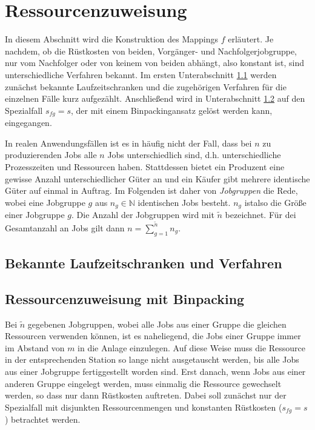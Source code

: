 \documentclass{scrreprt}
\begin{document}
\section{Ressourcenzuweisung}
\label{sec:Ressourcenzuweisung}
In diesem Abschnitt wird die Konstruktion des Mappings $f$ erläutert.
Je nachdem, ob die Rüstkosten von beiden, Vorgänger- und Nachfolgerjobgruppe, nur vom Nachfolger oder von keinem von beiden abhängt, also konstant ist,
sind unterschiedliche Verfahren bekannt.
Im ersten Unterabschnitt \ref{subsec:BekannteLaufzeitschrankenUndVerfahren} werden zunächst bekannte Laufzeitschranken und die zugehörigen Verfahren 
für die einzelnen Fälle kurz aufgezählt.
Anschließend wird in Unterabschnitt \ref{subsec:RessourcenzuweisungMitBinpacking} auf den Spezialfall $s_{fg}=s$, der mit einem Binpackingansatz gelöst werden kann,
eingegangen.

In realen Anwendungsfällen ist es in häufig nicht der Fall, dass bei $n$ zu produzierenden Jobs alle $n$ Jobs unterschiedlich sind,
d.h. unterschiedliche Prozesszeiten und Ressourcen haben.
Stattdessen bietet ein Produzent eine gewisse Anzahl unterschiedlicher Güter an und ein Käufer gibt mehrere identische Güter auf einmal in Auftrag.
Im Folgenden ist daher von \textit{Jobgruppen} die Rede, wobei eine Jobgruppe $g$ aus $n_g\in\mathbb{N}$ identischen Jobs besteht.
$n_g$ istalso die Größe einer Jobgruppe $g$.
Die Anzahl der Jobgruppen wird mit $\tilde{n}$ bezeichnet.
Für dei Gesamtanzahl an Jobs gilt dann $n = \sum_{g=1}^{\tilde{n}} n_g$.

\subsection{Bekannte Laufzeitschranken und Verfahren}
\label{subsec:BekannteLaufzeitschrankenUndVerfahren}

\subsection{Ressourcenzuweisung mit Binpacking}
\label{subsec:RessourcenzuweisungMitBinpacking}
Bei $\tilde{n}$ gegebenen Jobgruppen, wobei alle Jobs aus einer Gruppe die gleichen Ressourcen verwenden können,
ist es naheliegend, die Jobs einer Gruppe immer im Abstand von $m$ in die Anlage einzulegen.
Auf diese Weise muss die Ressource in der entsprechenden Station so lange nicht ausgetauscht werden,
bis alle Jobs aus einer Jobgruppe fertiggestellt worden sind.
Erst danach, wenn Jobs aus einer anderen Gruppe eingelegt werden, muss einmalig die Ressource gewechselt werden,
so dass nur dann Rüstkosten auftreten.
Dabei soll zunächst nur der Spezialfall mit disjunkten Ressourcenmengen und konstanten Rüstkosten ($s_{fg}=s$) betrachtet werden.
\end{document}

